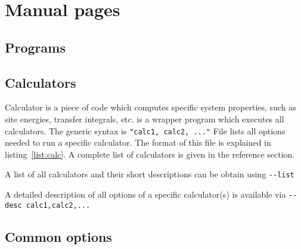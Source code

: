 \chapter{Manual pages}
%
%
\section{Programs}
\label{ref:programs}


\section{Calculators}
\label{ref:calculators}
\label{sec:calculators}

Calculator is a piece of code which computes specific system properties, such as site energies, transfer integrals, etc. \ctprun is a wrapper program which executes all calculators. The generic syntax is 
\vskip 0.2cm
{\noindent \small \ctprun \exe \texttt{"calc1, calc2, ..."} \opt \xmloptions }
\vskip 0.2cm
%
File \xmloptions lists all options needed to run a specific calculator. The format of this file is explained in listing~\ref{list:calc}. A complete list of calculators is given in the  reference section.
%


A list of all calculators and their short descriptions can be obtain using 
\vskip 0.1cm
{\noindent \small \ctprun \texttt{-{}-list} }
\vskip 0.1cm

A detailed description of all options of a specific calculator(s) is available via
\vskip 0.1cm
{\noindent \small \ctprun \texttt{-{}-desc calc1,calc2,...} }


\vfill

\section{Common options}
\label{ref:options}
{\small 

}
\vfill
